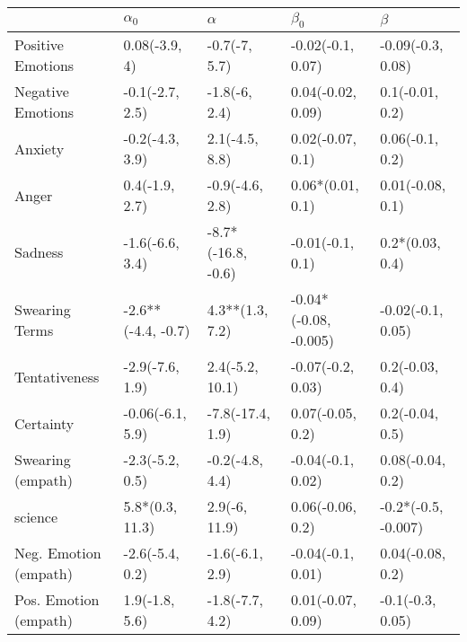 \begin{tabular}{lllll}
\toprule
{} &          $\alpha_0$ &            $\alpha$ &              $\beta_0$ &              $\beta$ \\
\midrule
Positive Emotions     &       0.08(-3.9, 4) &       -0.7(-7, 5.7) &      -0.02(-0.1, 0.07) &    -0.09(-0.3, 0.08) \\
Negative Emotions     &     -0.1(-2.7, 2.5) &       -1.8(-6, 2.4) &      0.04(-0.02, 0.09) &      0.1(-0.01, 0.2) \\
Anxiety               &     -0.2(-4.3, 3.9) &      2.1(-4.5, 8.8) &       0.02(-0.07, 0.1) &      0.06(-0.1, 0.2) \\
Anger                 &      0.4(-1.9, 2.7) &     -0.9(-4.6, 2.8) &       0.06*(0.01, 0.1) &     0.01(-0.08, 0.1) \\
Sadness               &     -1.6(-6.6, 3.4) &  -8.7*(-16.8, -0.6) &       -0.01(-0.1, 0.1) &      0.2*(0.03, 0.4) \\
Swearing Terms        &  -2.6**(-4.4, -0.7) &     4.3**(1.3, 7.2) &  -0.04*(-0.08, -0.005) &    -0.02(-0.1, 0.05) \\
Tentativeness         &     -2.9(-7.6, 1.9) &     2.4(-5.2, 10.1) &      -0.07(-0.2, 0.03) &      0.2(-0.03, 0.4) \\
Certainty             &    -0.06(-6.1, 5.9) &    -7.8(-17.4, 1.9) &       0.07(-0.05, 0.2) &      0.2(-0.04, 0.5) \\
Swearing (empath)     &     -2.3(-5.2, 0.5) &     -0.2(-4.8, 4.4) &      -0.04(-0.1, 0.02) &     0.08(-0.04, 0.2) \\
science               &     5.8*(0.3, 11.3) &       2.9(-6, 11.9) &       0.06(-0.06, 0.2) &  -0.2*(-0.5, -0.007) \\
Neg. Emotion (empath) &     -2.6(-5.4, 0.2) &     -1.6(-6.1, 2.9) &      -0.04(-0.1, 0.01) &     0.04(-0.08, 0.2) \\
Pos. Emotion (empath) &      1.9(-1.8, 5.6) &     -1.8(-7.7, 4.2) &      0.01(-0.07, 0.09) &     -0.1(-0.3, 0.05) \\
\bottomrule
\end{tabular}
